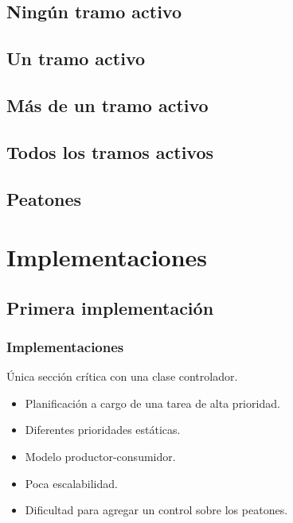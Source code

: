 \subsection{Ningún tramo activo}

\subsection{Un tramo activo}

\subsection{Más de un tramo activo}

\subsection{Todos los tramos activos}

\subsection{Peatones}

\section{Implementaciones}

\subsection{Primera implementación}

\begin{frame}
\frametitle{Implementaciones}
\begin{block}{Única sección crítica con una clase controlador.}
	\begin{itemize}
		\item Planificación a cargo de una tarea de alta prioridad.
		\item Diferentes prioridades estáticas.
		\item Modelo productor-consumidor.
		\item Poca escalabilidad.
		\item Dificultad para agregar un control sobre los peatones.
	\end{itemize}
\end{block}
\end{frame}

